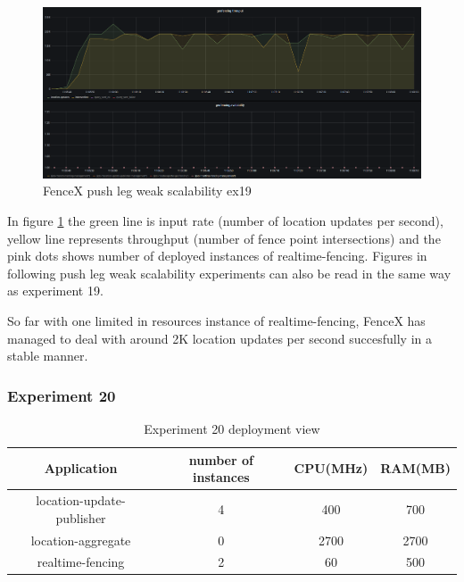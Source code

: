 \documentclass[a4]{report}
\begin{document}
    \begin{figure}[h!]
        \caption{FenceX push leg weak scalability ex19}
        \label{fig:ex19}
        \includegraphics[scale=0.4]{images/evaluation/ex19-benchmarking-ongoing-1per16sec.png}
    \end{figure}

    In figure \ref{fig:ex19} the green line is input rate (number of location updates per second),
    yellow line represents throughput (number of fence point intersections) and the pink dots shows number of
    deployed instances of realtime-fencing.
    Figures in following push leg weak scalability experiments can also be read in the same way as experiment 19.

    So far with one limited in resources instance of realtime-fencing, FenceX has managed to deal with around 2K
    location updates per second succesfully in a stable manner.

    \clearpage

    \subsubsection{Experiment 20}
    \begin{table}[h!]
        \centering
        \begin{tabular}{|c|c|c|c|}
            \hline
            Application               & number of instances & CPU(MHz) & RAM(MB) \\
            \hline
            location-update-publisher & 4                   & 400      & 700     \\
            location-aggregate        & 0                   & 2700     & 2700    \\
            realtime-fencing          & 2                   & 60       & 500     \\
            \hline
        \end{tabular}
        \caption{Experiment 20 deployment view}
        \label{table:ex20-dv}
    \end{table}
\end{document}
